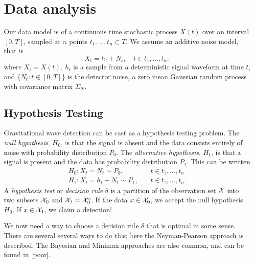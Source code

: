 


\chapter{Data analysis}           
Our data model is of a continuous time stochastic process $X(t)$ over an interval $[0,T]$, sampled at $n$ points ${t_1, \ldots, t_n} \subset T$. We assume an additive noise model, that is 
\begin{equation}
X_t=h_t+N_t, \hspace{12pt} t\in {t_1, \ldots, t_n}  ,
\end{equation}
where $X_t=X(t)$, $h_t$ is a sample from a deterministic signal waveform at time $t$, and $\{N_t: t \in [0,T]\}$ is the detector noise, a zero mean Gaussian random process with covariance matrix $\Sigma_N$. 


\section{Hypothesis Testing}
Gravitational wave detection can be cast as a hypothesis testing problem. The \textit{null hypothesis}, $H_0$, is that the signal is absent and the data consists entirely of noise with probability distribution $P_0$. The \textit{alternative hypothesis}, $H_1$, is that a signal is present and the data has probability distribution $P_1$. This can be written
\begin{equation}
\label{eq:hyppair}
\begin{array}{ll}
H_0: X_t = N_t \sim P_0, &\hspace{12pt} t\in {t_1, \ldots, t_n} \\
H_1: X_t = h_t + N_t \sim P_1, &\hspace{12pt} t\in {t_1, \ldots, t_n}. 
\end{array}
\end{equation}
A \textit{hypothesis test} or \textit{decision rule} $\delta$ is a partition of the observation set $\mathcal{X}$ into two subsets $\mathcal{X}_0$ and $\mathcal{X}_1=\mathcal{X}_0^c$. If the data  $x \in \mathcal{X}_0$, we accept the null hypothesis $H_0$. If $x \in \mathcal{X}_1$, we claim a detection!

We now need a way to choose a decision rule $\delta$ that is optimal in some sense. There are several several ways to do this; here the Neyman-Pearson approach is described. The Bayesian and Minimax approaches are also common, and can be found in [poor].

